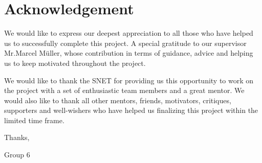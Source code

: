 \chapter*{Acknowledgement}
\label{cha:acknowledgments}
\vspace{20 mm}

We would like to express our deepest appreciation to all those who have helped us to successfully complete this project. A special gratitude to our supervisor Mr.Marcel Müller, whose contribution in terms of guidance, advice and helping us to keep motivated throughout the project. 


We would like to thank the SNET for providing us this opportunity to work on the project with a set of enthusiastic team members and a great mentor. We would also like to thank all other mentors, friends, motivators, critiques, supporters and well-wishers who have helped us finalizing this project within the limited time frame. 

\vspace{20 mm}
\noindent Thanks, 
\vspace{2 mm}

\noindent Group 6


